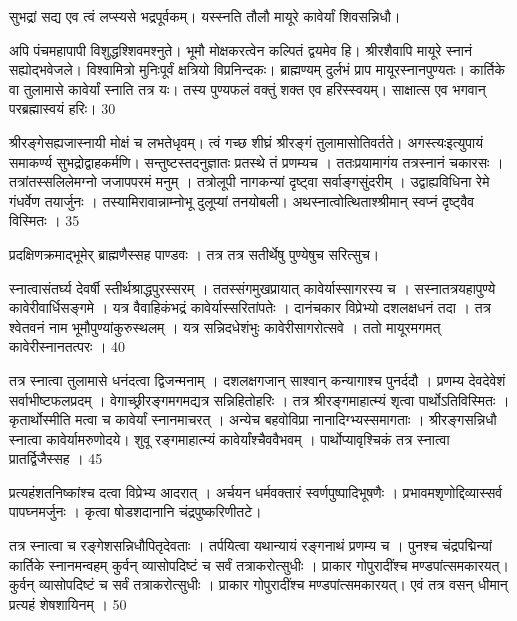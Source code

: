   सुभद्रां सद्य एव त्वं लप्स्यसे भद्रपूर्वकम्।
 यस्स्नति तौलौ मायूरे कावेर्यां शिवसन्निधौ।
 
अपि पंचमहापापी विशुद्धश्शिवमश्नुते।
 भूमौ मोक्षकरत्वेन कल्पितं द्वयमेव हि।
 श्रीरशैवापि मायूरे स्नानं सह्योद्भवेजले।
 विश्वामित्रो मुनिःपूर्वं क्षत्रियो विप्रनिन्दकः।
 ब्राह्मण्यम् दुर्लभं प्राप मायूरस्नानपुण्यतः।
 कार्तिके वा तुलामासे कावेर्यां स्नाति तत्र यः।
 तस्य पुण्यफलं वक्तुं शक्त एव हरिस्स्वयम्।
 साक्षात्स एव भगवान् परब्रह्मास्वयं हरिः।
 30

  श्रीरङ्गेसह्यजास्नायी मोक्षं च लभतेधृवम्।
 त्वं गच्छ शीघ्रं श्रीरङ्गं तुलामासोतिवर्तते।
 अगस्त्यःइत्युपायं समाकर्ण्य सुभद्रोद्वाहकर्मणि।
 सन्तुष्टस्तदनुज्ञातः प्रतस्थे तं प्रणम्यच ।
 ततःप्रयामागंय तत्रस्नानं चकारसः ।
 तत्रांतस्सलिलेमग्नो जजापपरमं मनुम् ।
 तत्रोलूपी नागकन्यां दृष्ट्वा सर्वाङ्गसुंदरीम् ।
 उद्वाह्यविधिना रेमे गंधर्वेण तयार्जुनः ।
 तस्यामिरावान्नाम्नोभू दुलूप्यां तनयोबली।
 अथस्नात्वोत्थिताश्श्रीमान् स्वप्नं दृष्ट्वैव विस्मितः ।
 35

  प्रदक्षिणक्रमाद्भूमेर् ब्राह्मणैस्सह पाण्डवः ।
 तत्र तत्र सतीर्थेषु पुण्येषुच सरित्सुच।
 
स्नात्वासंतर्घ्य देवर्षी स्तीर्थश्राद्धपुरस्सरम् ।
 ततस्संगमुखप्रायात् कावेर्यास्सागरस्य च ।
 सस्नातत्रयहापुण्ये कावेरीवार्धिसङ्गमे ।
 यत्र वैवाहिकंभद्रं कावेर्यास्सरितांपतेः ।
 दानंचकार विप्रेभ्यो दशलक्षधनं तदा ।
 तत्र श्वेतवनं नाम भूमौपुण्यांकुरुस्थलम् ।
 यत्र सन्निदधेशंभुः कावेरीसागरोत्सवे ।
 ततो मायूरमगमत् कावेरीस्नानतत्परः ।
 40

  तत्र स्नात्वा तुलामासे धनंदत्वा द्विजन्मनाम् ।
 दशलक्षगजान् साश्वान् कन्यागाश्च पुनर्ददौ ।
 प्रणम्य देवदेवेशं सर्वाभीष्टफलप्रदम् ।
 वेगाच्छ्रीरङ्गमगमद्यत्र सन्निहितोहरिः ।
 तत्र श्रीरङ्गमाहात्म्यं शृत्वा पार्थोऽतिविस्मितः ।
 कृतार्थोस्मीति मत्वा च कावेर्यां स्नानमाचरत् ।
 अन्येच बहवोविप्रा नानादिग्भ्यस्समागताः ।
 श्रीरङ्गसन्निधौ स्नात्वा कावेर्यामरुणोदये।
 शुवू रङ्गमाहात्म्यं कावेर्यांश्चैववैभवम् ।
 पार्थोप्यावृश्चिकं तत्र स्नात्वा प्रातर्द्विजैस्सह ।
 45

  प्रत्यहंशतनिष्कांश्च दत्वा विप्रेभ्य आदरात् ।
 अर्चयन धर्मवक्तारं स्वर्णपुष्पादिभूषणैः ।
 प्रभावमशृणोद्दिव्यास्सर्व पापघ्नमर्जुनः ।
 कृत्वा षोडशदानानि चंद्रपुष्करिणीतटे।
 
तत्र स्नात्वा च रङ्गेशसन्निधौपितृदेवताः ।
 तर्पयित्वा यथान्यायं रङ्गनाथं प्रणम्य च ।
 पुनश्च चंद्रपद्मिन्यां कार्तिके स्नानमन्वहम् कुर्वन् व्यासोपदिष्टं च सर्वं तत्राकरोत्सुधीः ।
 प्राकार गोपुरादींश्च मण्डपांत्समकारयत्।
 कुर्वन् व्यासोपदिष्टं च सर्वं तत्राकरोत्सुधीः ।
 प्राकार गोपुरादींश्च मण्डपांत्समकारयत्।
 एवं तत्र वसन् धीमान् प्रत्यहं शेषशायिनम् ।
 50

